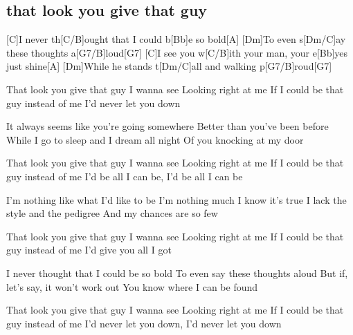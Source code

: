 \subsection*{that look you give that guy   }
\begin{guitar}
{}[C]I never th[C/B]ought that I could b[Bb]e so bold{}[A]{}
{}[Dm]{}To even s[Dm/C]ay these thoughts a[G7/B]loud{}[G7]{}
{}[C]{}I see you w[C/B]ith your man, your e[Bb]yes just shine{}[A]{}
{}[Dm]While he stands t[Dm/C]all and walking p[G7/B]roud{}[G7]{}



That look you give that guy I wanna see
Looking right at me
If I could be that guy instead of me
I'd never let you down



It always seems like you're going somewhere
Better than you've been before
While I go to sleep and I dream all night
Of you knocking at my door



That look you give that guy I wanna see
Looking right at me
If I could be that guy instead of me
I'd be all I can be, I'd be all I can be



I'm nothing like what I'd like to be
I'm nothing much I know it's true
I lack the style and the pedigree
And my chances are so few



That look you give that guy I wanna see
Looking right at me
If I could be that guy instead of me
I'd give you all I got



I never thought that I could be so bold
To even say these thoughts aloud
But if, let's say, it won't work out
You know where I can be found



That look you give that guy I wanna see
Looking right at me
If I could be that guy instead of me
I'd never let you down, I'd never let you down
\end{guitar}
